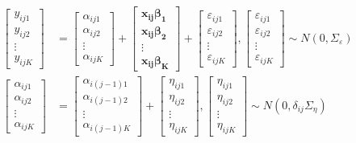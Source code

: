 \documentclass[
]{article}
\begin{document}
\begin{equation*}
\begin{aligned}
\begin{bmatrix}
y_{ij1}\\
y_{ij2}\\
\vdots\\
y_{ijK}
\end{bmatrix}
&= \begin{bmatrix}
\alpha_{ij1}\\
\alpha_{ij2}\\
\vdots\\
\alpha_{ijK}
\end{bmatrix}
+ 
\begin{bmatrix}
\boldsymbol{x_{ij}\beta_1}\\
\boldsymbol{x_{ij}\beta_2}\\
\vdots\\
\boldsymbol{x_{ij}\beta_K} 
\end{bmatrix} +
\begin{bmatrix}
\varepsilon_{ij1}\\
\varepsilon_{ij2}\\
\vdots\\
\varepsilon_{ijK}
\end{bmatrix},  
\begin{bmatrix}
\varepsilon_{ij1}\\
\varepsilon_{ij2}\\
\vdots\\
\varepsilon_{ijK}
\end{bmatrix} 
\sim N(0, \Sigma_\varepsilon
)\\
\begin{bmatrix}
\alpha_{ij1}\\
\alpha_{ij2}\\
\vdots\\
\alpha_{ijK}
\end{bmatrix} & = 
\begin{bmatrix}
\alpha_{i(j-1)1}\\
\alpha_{i(j-1)2}\\
\vdots\\
\alpha_{i(j-1)K}
\end{bmatrix} +
\begin{bmatrix}
\eta_{ij1}\\
\eta_{ij2}\\
\vdots\\
\eta_{ijK}
\end{bmatrix}, 
\begin{bmatrix}
\eta_{ij1}\\
\eta_{ij2}\\
\vdots\\
\eta_{ijK}
\end{bmatrix} \sim N(0, \delta_{ij}\Sigma_\eta)
\end{aligned}
\end{equation*}
\end{document}
